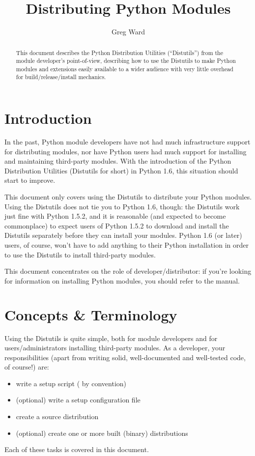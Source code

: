 \documentclass{howto}
\title{Distributing Python Modules}
\author{Greg Ward}
\begin{document}
\maketitle
\begin{abstract}
  \noindent
  This document describes the Python Distribution Utilities
  (``Distutils'') from the module developer's point-of-view, describing
  how to use the Distutils to make Python modules and extensions easily
  available to a wider audience with very little overhead for
  build/release/install mechanics.
\end{abstract}

\tableofcontents

\section{Introduction}
\label{intro}

In the past, Python module developers have not had much infrastructure
support for distributing modules, nor have Python users had much support
for installing and maintaining third-party modules.  With the
introduction of the Python Distribution Utilities (Distutils for short)
in Python 1.6, this situation should start to improve.

This document only covers using the Distutils to distribute your Python
modules.  Using the Distutils does not tie you to Python 1.6, though:
the Distutils work just fine with Python 1.5.2, and it is reasonable
(and expected to become commonplace) to expect users of Python 1.5.2 to
download and install the Distutils separately before they can install
your modules.  Python 1.6 (or later) users, of course, won't have to add
anything to their Python installation in order to use the Distutils to
install third-party modules.

This document concentrates on the role of developer/distributor: if
you're looking for information on installing Python modules, you
should refer to the  manual.


\section{Concepts \& Terminology}
\label{concepts}

Using the Distutils is quite simple, both for module developers and for
users/administrators installing third-party modules.  As a developer,
your responsibilities (apart from writing solid, well-documented and
well-tested code, of course!) are:
\begin{itemize}
\item write a setup script ( by convention)
\item (optional) write a setup configuration file
\item create a source distribution
\item (optional) create one or more built (binary) distributions
\end{itemize}
Each of these tasks is covered in this document.
\end{document}
